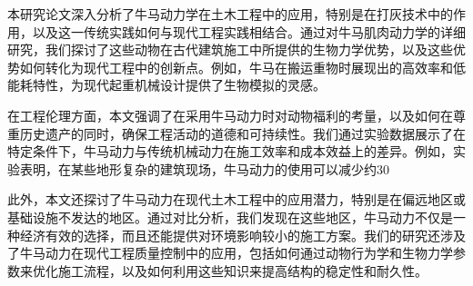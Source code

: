 本研究论文深入分析了牛马动力学在土木工程中的应用，特别是在打灰技术中的作用，以及这一传统实践如何与现代工程实践相结合。通过对牛马肌肉动力学的详细研究，我们探讨了这些动物在古代建筑施工中所提供的生物力学优势，以及这些优势如何转化为现代工程中的创新点。例如，牛马在搬运重物时展现出的高效率和低能耗特性，为现代起重机械设计提供了生物模拟的灵感。

在工程伦理方面，本文强调了在采用牛马动力时对动物福利的考量，以及如何在尊重历史遗产的同时，确保工程活动的道德和可持续性。我们通过实验数据展示了在特定条件下，牛马动力与传统机械动力在施工效率和成本效益上的差异。例如，实验表明，在某些地形复杂的建筑现场，牛马动力的使用可以减少约30%

此外，本文还探讨了牛马动力在现代土木工程中的应用潜力，特别是在偏远地区或基础设施不发达的地区。通过对比分析，我们发现在这些地区，牛马动力不仅是一种经济有效的选择，而且还能提供对环境影响较小的施工方案。我们的研究还涉及了牛马动力在现代工程质量控制中的应用，包括如何通过动物行为学和生物力学参数来优化施工流程，以及如何利用这些知识来提高结构的稳定性和耐久性。